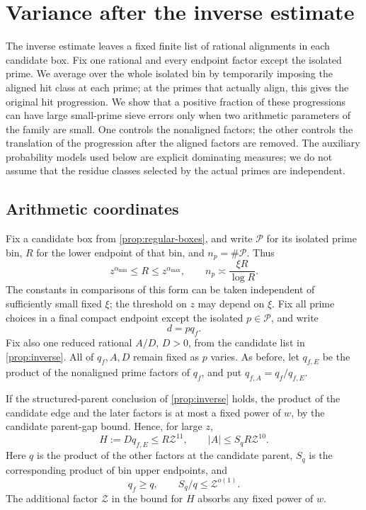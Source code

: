 \section{Variance after the inverse estimate}\label{sec:variance}

The inverse estimate leaves a fixed finite list of rational alignments in each
candidate box. Fix one rational and every endpoint factor except the
isolated prime. We average over the whole isolated bin by temporarily
imposing the aligned hit class at each prime; at the primes that actually
align, this gives the original hit progression. We show that a positive
fraction of these progressions can have large small-prime sieve errors
only when two arithmetic parameters of the family are small. One controls
the nonaligned factors; the other controls the translation of the
progression after the aligned factors are removed.
The auxiliary probability models used below are explicit dominating measures;
we do not assume that the residue classes selected by the actual primes are
independent.

\subsection{Arithmetic coordinates}

Fix a candidate box from \cref{prop:regular-boxes}, and write
\(\mathcal P\) for its isolated prime bin, \(R\) for the lower endpoint of
that bin, and \(n_p=\#\mathcal P\). Thus
\[
 z^{\alpha_{\min}}\le R\le z^{\alpha_{\max}},
 \qquad n_p\asymp \frac{\xi R}{\log R}.
\]
The constants in comparisons of this form can be taken independent of
sufficiently small fixed \(\xi\); the threshold on \(z\) may depend on \(\xi\).
Fix all prime choices in a final compact endpoint except the isolated
\(p\in\mathcal P\), and write
\[
 d=pq_f.
\]
Fix also one reduced rational \(A/D\), \(D>0\), from the candidate list in
\cref{prop:inverse}. All of \(q_f,A,D\) remain fixed as \(p\) varies.
As before, let \(q_{f,E}\) be the product of the nonaligned prime factors
of \(q_f\), and put \(q_{f,A}=q_f/q_{f,E}\).

If the structured-parent conclusion of \cref{prop:inverse} holds, the
product of the candidate edge and the later factors is at most a fixed
power of \(w\), by the candidate parent-gap bound. Hence, for large \(z\),
\begin{equation}\label{eq:variance-structure-size}
 H:=Dq_{f,E}\le R\mathcal Z^{11},
 \qquad
 |A|\le S_qR\mathcal Z^{10}.
\end{equation}
Here \(q\) is the product of the other factors at the candidate parent,
\(S_q\) is the corresponding product of bin upper endpoints, and
\[
 q_f\ge q,\qquad S_q/q\le\mathcal Z^{o(1)}.
\]
The additional factor \(\mathcal Z\) in the bound for \(H\) absorbs any
fixed power of \(w\).

